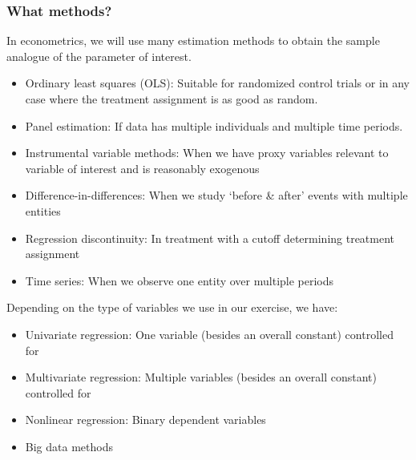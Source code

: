 \documentclass[aspectratio=169]{beamer}
\newenvironment{wideitemize}{\itemize\addtolength{\itemsep}{10pt}}{\enditemize}
\begin{document}
\begin{frame}
\frametitle{What methods?}
\begin{wideitemize}
\item In econometrics, we will use many estimation methods to obtain the sample analogue of the parameter of interest. 
\begin{itemize}
\item Ordinary least squares (OLS): Suitable for randomized control trials or in any case where the treatment assignment is as good as random.
\item Panel estimation: If data has multiple individuals and multiple time periods.
\item Instrumental variable methods: When we have proxy variables relevant to variable of interest and is reasonably exogenous
\item Difference-in-differences: When we study `before \& after' events with multiple entities
\item Regression discontinuity: In treatment with a cutoff determining treatment assignment
\item Time series: When we observe one entity over multiple periods 
\end{itemize}
\item Depending on the type of variables we use in our exercise, we have:
\begin{itemize}
\item Univariate regression: One variable (besides an overall constant) controlled for
\item Multivariate regression: Multiple variables (besides an overall constant) controlled for
\item Nonlinear regression: Binary dependent variables
\item Big data methods
\end{itemize}
 \end{wideitemize}
\end{frame}
\end{document}

